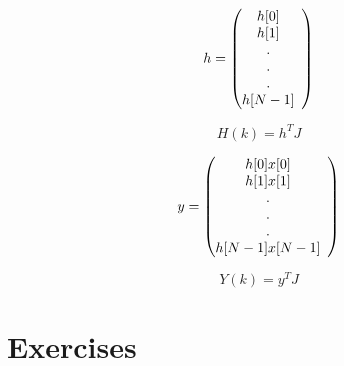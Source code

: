 \documentclass[journal,12pt,twocolumn]{IEEEtran}
\renewcommand\thesection{\arabic{section}}
\begin{document}
\begin{enumerate}[label=\thesection.\arabic*]
\[
\begin{array}{lc}
    h = 
  \left(\begin{array}{@{}ccc@{}}
    h[0] \\
    h[1] \\
    . \\
    . \\
    . \\
    h[N-1] \\
  \end{array}\right) \\[15pt]
\end{array}
\]

\begin{equation}
    H(k) = h^{T} J
\end{equation}

\[
\begin{array}{lc}
    y = 
  \left(\begin{array}{@{}ccc@{}}
    h[0] x[0] \\
    h[1] x[1] \\
    . \\
    . \\
    . \\
    h[N-1] x[N-1] \\
  \end{array}\right) \\[15pt]
\end{array}
\]

\begin{equation}
    Y(k) = y^{T} J
\end{equation}

\end{enumerate}
%
\section{Exercises}
\end{document}
